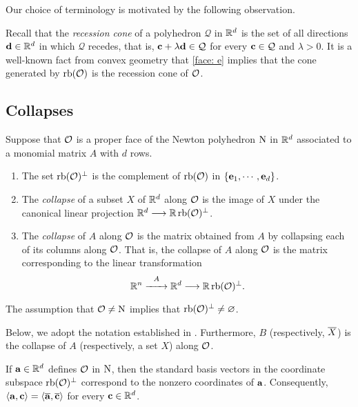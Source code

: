 \documentclass[11pt]{amsart}
\begin{document}
Our choice of terminology is motivated by the following observation.

\begin{remark}  Recall that the \emph{recession cone} of a polyhedron $\mathcal{Q}$ in $\mathbb{R}^d$ is the set of all directions $\mathbf{d} \in \mathbb{R}^d$ in which $\mathcal{Q}$ recedes, that is, $\mathbf{c} + \lambda \mathbf{d} \in \mathcal{Q}$ for every $\mathbf{c} \in \mathcal{Q}$ and $\lambda > 0$.  It is a well-known fact from convex geometry that  \eqref{face: e} implies that the cone generated by $\operatorname{rb}(\mathcal{O})$ is the recession cone of $\mathcal{O}$.
\end{remark}

\subsection{Collapses} 

\begin{definition}  
\label{collapse: D}
 Suppose that $\mathcal{O}$ is a proper face of the Newton polyhedron $\mathrm{N}$ in $\mathbb{R}^d$ associated to a monomial matrix $A$ with $d$ rows.  

\begin{enumerate}
\item The set $\operatorname{rb}(\mathcal{O})^{\perp}$ is the complement of $\operatorname{rb}(\mathcal{O})$ in $\{ \mathbf{e}_1, \cdots, \mathbf{e}_d \}$.
\item The \emph{collapse} of a subset $X$ of $\mathbb{R}^d$ along $\mathcal{O}$ is the image of $X$ under the canonical linear projection $\mathbb{R}^d \longrightarrow \mathbb{R} \operatorname{rb}(\mathcal{O})^{\perp}$.
\item The \emph{collapse} of $A$ along $\mathcal{O}$ is the matrix obtained from $A$ by collapsing each of its columns along $\mathcal{O}$.  That is, the collapse of $A$ along $\mathcal{O}$ is the matrix corresponding to the linear transformation  
%
\[ \mathbb{R}^n \stackrel{A}{\xrightarrow{\hspace*{6mm}}} \mathbb{R}^d \longrightarrow \mathbb{R} \operatorname{rb}(\mathcal{O})^{\perp}.\]  
%
\end{enumerate}
\end{definition}     

\begin{remark}  The assumption that $\mathcal{O} \neq \mathrm{N}$ implies that $\operatorname{rb}(\mathcal{O})^{\perp} \neq \varnothing$.
\end{remark}

Below, we adopt the notation established in .  Furthermore,  $B$ (respectively, $\overline{X}$) is the collapse of $A$ (respectively, a set $X$) along $\mathcal{O}$.


\begin{remark}
\label{collapse of a defining vector: R}
If $\mathbf{a} \in \mathbb{R}^d$ defines $\mathcal{O}$ in $\mathrm{N}$, then the standard basis vectors in the coordinate subspace $\operatorname{rb}(\mathcal{O})^{\perp}$ correspond to the nonzero coordinates of $\mathbf{a}$.  Consequently, $\langle \mathbf{a}, \mathbf{c} \rangle = \langle \overline{\mathbf{a}}, \overline{\mathbf{c}} \rangle$ for every $\mathbf{c} \in \mathbb{R}^d$.
\end{remark}
\end{document}

